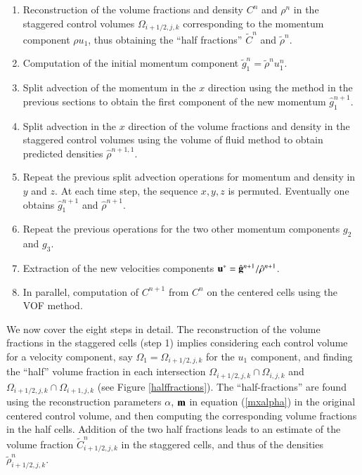 \begin{enumerate}
\item Reconstruction of the volume fractions and density $C^{n}$ and $\rho^{n}$ in the staggered control volumes 
$\Omega_{i+1/2,j,k}$ corresponding to the momentum component $\rho u_1$, thus obtaining the ``half fractions'' $\tilde C^{n}$ and  $\tilde \rho^{n}$. 
\item Computation of the initial momentum component $\tilde g_1^{n} = \tilde \rho^{n} u_1^{n}$.
\item Split advection of the momentum in the $x$ direction 
using the method in the previous sections to obtain 
the first component of the new momentum $\hat g_1^{n+1}$.
\item Split advection in the $x$ direction of the volume fractions and density in the staggered control volumes 
using the volume of fluid method to obtain predicted densities $\hat\rho^{n+1,1}$.
\item Repeat the previous split advection operations for momentum and density in $y$ and $z$. At each time step, the sequence $x, y, z$
is permuted. Eventually one obtains $\hat g_1^{n+1}$ and $\hat\rho^{n+1}$.
\item Repeat the previous operations for the two other momentum components $g_2$ and  $g_3$. 
\item Extraction of the  new velocities components ${\bf u}^{*}=\hat {{\bf g}}^{n+1}/\hat\rho^{n+1}$.
\item In parallel, computation of $C^{n+1}$ from $C^n$ on the centered cells using
the VOF method. 

\end{enumerate}

We now cover the eight steps in detail. 
The reconstruction of the volume fractions in the staggered cells (step 1) implies considering each control volume for a velocity component, say $\Omega_1=\Omega_{i+1/2,j,k}$ for the $u_1$ component, and finding the ``half'' volume fraction
in each intersection $ \Omega_{i+1/2,j,k} \cap  \Omega_{i,j,k}$ and  $ \Omega_{i+1/2,j,k} \cap  \Omega_{i+1,j,k}$ 
(see Figure \ref{halffractions}). The ``half-fractions'' are found using the reconstruction parameters
$\alpha$, ${\bf m}$ in equation (\ref{mxalpha}) in the original
centered control volume, and then computing the corresponding volume fractions in the half 
cells. Addition of the two half fractions leads to an estimate of the volume fraction $\tilde C^n_{i+1/2,j,k}$ in the staggered cells, and thus of the densities $\tilde \rho^n_{i+1/2,j,k}$. 

